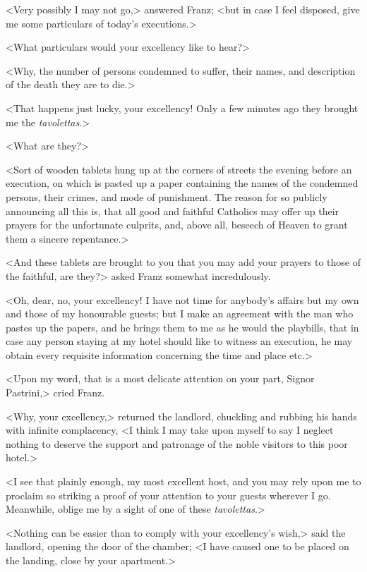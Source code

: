  <Very possibly I may not go,> answered Franz; <but in case I feel disposed, give me some particulars of today's executions.> 

 <What particulars would your excellency like to hear?> 

 <Why, the number of persons condemned to suffer, their names, and description of the death they are to die.> 

 <That happens just lucky, your excellency! Only a few minutes ago they brought me the \textit{tavolettas}.> 

 <What are they?> 

 <Sort of wooden tablets hung up at the corners of streets the evening before an execution, on which is pasted up a paper containing the names of the condemned persons, their crimes, and mode of punishment. The reason for so publicly announcing all this is, that all good and faithful Catholics may offer up their prayers for the unfortunate culprits, and, above all, beseech of Heaven to grant them a sincere repentance.> 

 <And these tablets are brought to you that you may add your prayers to those of the faithful, are they?> asked Franz somewhat incredulously. 

 <Oh, dear, no, your excellency! I have not time for anybody's affairs but my own and those of my honourable guests; but I make an agreement with the man who pastes up the papers, and he brings them to me as he would the playbills, that in case any person staying at my hotel should like to witness an execution, he may obtain every requisite information concerning the time and place etc.> 

 <Upon my word, that is a most delicate attention on your part, Signor Pastrini,> cried Franz. 

 <Why, your excellency,> returned the landlord, chuckling and rubbing his hands with infinite complacency, <I think I may take upon myself to say I neglect nothing to deserve the support and patronage of the noble visitors to this poor hotel.> 

 <I see that plainly enough, my most excellent host, and you may rely upon me to proclaim so striking a proof of your attention to your guests wherever I go. Meanwhile, oblige me by a sight of one of these \textit{tavolettas}.> 

 <Nothing can be easier than to comply with your excellency's wish,> said the landlord, opening the door of the chamber; <I have caused one to be placed on the landing, close by your apartment.> 


